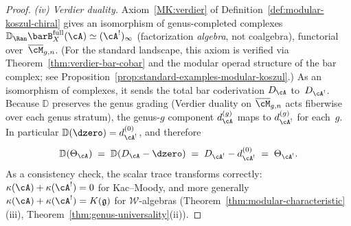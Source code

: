 \begin{proof}
\emph{(iv) Verdier duality.}
Axiom~\textup{\ref{MK:verdier}} of
Definition~\textup{\ref{def:modular-koszul-chiral}}
gives an isomorphism of genus-completed complexes
$\mathbb{D}_{\Ran}\barB^{\mathrm{full}}_X(\cA)
\simeq (\cA^!)_\infty$
(factorization \emph{algebra}, not coalgebra),
functorial over~$\overline{\cM}_{g,n}$.
\textup{(}For the standard landscape, this axiom is
verified via Theorem~\textup{\ref{thm:verdier-bar-cobar}}
and the modular operad structure of the bar complex;
see Proposition~\textup{\ref{prop:standard-examples-modular-koszul}}.\textup{)}
As an isomorphism of complexes, it sends the total bar
coderivation $D_\cA$ to~$D_{\cA^!}$.
Because $\mathbb{D}$ preserves the genus grading
(Verdier duality on $\overline{\cM}_{g,n}$ acts
fiberwise over each genus stratum), the
genus-$g$ component $d_\cA^{(g)}$ maps to
$d_{\cA^!}^{(g)}$ for each~$g$.
In particular $\mathbb{D}(\dzero) = d^{(0)}_{\cA^!}$,
and therefore
\[
\mathbb{D}(\Theta_\cA)
\;=\; \mathbb{D}(D_\cA - \dzero)
\;=\; D_{\cA^!} - d^{(0)}_{\cA^!}
\;=\; \Theta_{\cA^!}.
\]
As a consistency check, the scalar trace transforms
correctly:
$\kappa(\cA) + \kappa(\cA^!) = 0$ for Kac--Moody, and
more generally $\kappa(\cA) + \kappa(\cA^!) = K(\mathfrak{g})$
for $\mathcal{W}$-algebras
(Theorem~\ref{thm:modular-characteristic}(iii),
Theorem~\ref{thm:genus-universality}(ii)).
\end{proof}

